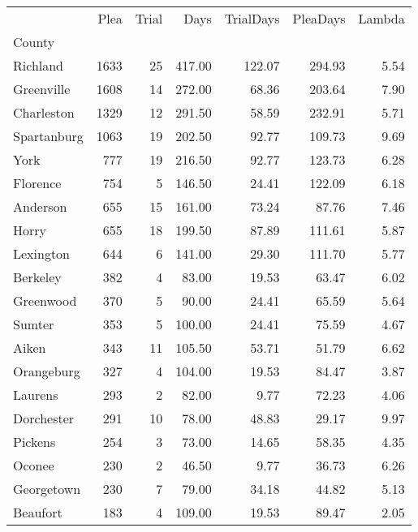 \begin{tabular}{lrrrrrr}
\toprule
{} &  Plea &  Trial &   Days &  TrialDays &  PleaDays &  Lambda \\
County       &       &        &        &            &           &         \\
\midrule
Richland     &  1633 &     25 & 417.00 &     122.07 &    294.93 &    5.54 \\
Greenville   &  1608 &     14 & 272.00 &      68.36 &    203.64 &    7.90 \\
Charleston   &  1329 &     12 & 291.50 &      58.59 &    232.91 &    5.71 \\
Spartanburg  &  1063 &     19 & 202.50 &      92.77 &    109.73 &    9.69 \\
York         &   777 &     19 & 216.50 &      92.77 &    123.73 &    6.28 \\
Florence     &   754 &      5 & 146.50 &      24.41 &    122.09 &    6.18 \\
Anderson     &   655 &     15 & 161.00 &      73.24 &     87.76 &    7.46 \\
Horry        &   655 &     18 & 199.50 &      87.89 &    111.61 &    5.87 \\
Lexington    &   644 &      6 & 141.00 &      29.30 &    111.70 &    5.77 \\
Berkeley     &   382 &      4 &  83.00 &      19.53 &     63.47 &    6.02 \\
Greenwood    &   370 &      5 &  90.00 &      24.41 &     65.59 &    5.64 \\
Sumter       &   353 &      5 & 100.00 &      24.41 &     75.59 &    4.67 \\
Aiken        &   343 &     11 & 105.50 &      53.71 &     51.79 &    6.62 \\
Orangeburg   &   327 &      4 & 104.00 &      19.53 &     84.47 &    3.87 \\
Laurens      &   293 &      2 &  82.00 &       9.77 &     72.23 &    4.06 \\
Dorchester   &   291 &     10 &  78.00 &      48.83 &     29.17 &    9.97 \\
Pickens      &   254 &      3 &  73.00 &      14.65 &     58.35 &    4.35 \\
Oconee       &   230 &      2 &  46.50 &       9.77 &     36.73 &    6.26 \\
Georgetown   &   230 &      7 &  79.00 &      34.18 &     44.82 &    5.13 \\
Beaufort     &   183 &      4 & 109.00 &      19.53 &     89.47 &    2.05 \\

\end{tabular}
